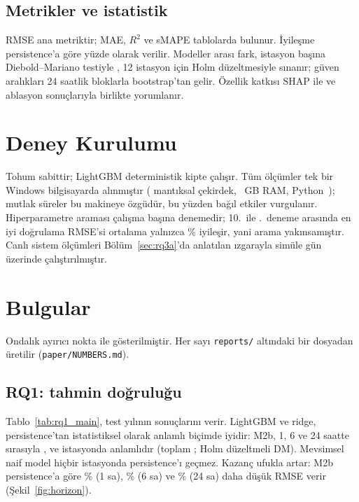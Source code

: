 \documentclass[conference]{IEEEtran}
\begin{document}
\subsection{Metrikler ve istatistik}
RMSE ana metriktir; MAE, $R^2$ ve sMAPE tablolarda bulunur. İyileşme persistence'a göre yüzde olarak verilir. Modeller arası fark, istasyon başına Diebold--Mariano testiyle \cite{R24,R25}, 12 istasyon için Holm düzeltmesiyle sınanır; güven aralıkları 24 saatlik bloklarla bootstrap'tan gelir. Özellik katkısı SHAP ile \cite{R26} ve ablasyon sonuçlarıyla birlikte yorumlanır.

\section{Deney Kurulumu}
Tohum \nSeed{} sabittir; LightGBM deterministik kipte çalışır. Tüm ölçümler tek bir Windows bilgisayarda alınmıştır (\nCpuCount{} mantıksal çekirdek, \nRamGb{}~GB RAM, Python~\nPyVersion{}); mutlak süreler bu makineye özgüdür, bu yüzden bağıl etkiler vurgulanır. Hiperparametre araması çalışma başına \nOptunaTrials{} denemedir; 10.\ ile \nOptunaTrials{}.\ deneme arasında en iyi doğrulama RMSE'si ortalama yalnızca \%\nTuneGainTenTwenty{} iyileşir, yani arama yakınsamıştır. Canlı sistem ölçümleri Bölüm~\ref{sec:rq3a}'da anlatılan ızgarayla \nSimDays{} simüle gün üzerinde çalıştırılmıştır.

\section{Bulgular}
Ondalık ayırıcı nokta ile gösterilmiştir. Her sayı \texttt{reports/} altındaki bir dosyadan üretilir (\texttt{paper/NUMBERS.md}).

\subsection{RQ1: tahmin doğruluğu}
Tablo~\ref{tab:rq1_main}, test yılının sonuçlarını verir. LightGBM ve ridge, persistence'tan istatistiksel olarak anlamlı biçimde iyidir: M2b, 1, 6 ve 24 saatte sırasıyla \nDmMtwobVsBZeroHOne{}, \nDmMtwobVsBZeroHSix{} ve \nDmMtwobVsBZeroHTwentyFour{} istasyonda anlamlıdır (toplam \nLosoStations{}; Holm düzeltmeli DM). Mevsimsel naif model hiçbir istasyonda persistence'ı geçmez. Kazanç ufukla artar: M2b persistence'a göre \%\nImprMtwobHOne{} (1 sa), \%\nImprMtwobHSix{} (6 sa) ve \%\nImprMtwobHTwentyFour{} (24 sa) daha düşük RMSE verir (Şekil~\ref{fig:horizon}).
\end{document}
